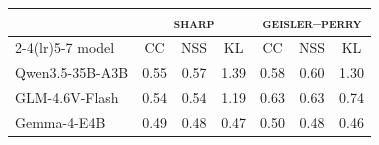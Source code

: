 \begin{tabular}{lcccccc}
\toprule
 & \multicolumn{3}{c}{\textsc{sharp}} & \multicolumn{3}{c}{\textsc{geisler--perry}} \\
\cmidrule(lr){2-4}\cmidrule(lr){5-7}
model & CC & NSS & KL & CC & NSS & KL \\
\midrule
Qwen3.5-35B-A3B & 0.55 & 0.57 & 1.39 & 0.58 & 0.60 & 1.30 \\
GLM-4.6V-Flash  & 0.54 & 0.54 & 1.19 & 0.63 & 0.63 & 0.74 \\
Gemma-4-E4B     & 0.49 & 0.48 & 0.47 & 0.50 & 0.48 & 0.46 \\
\bottomrule
\end{tabular}
